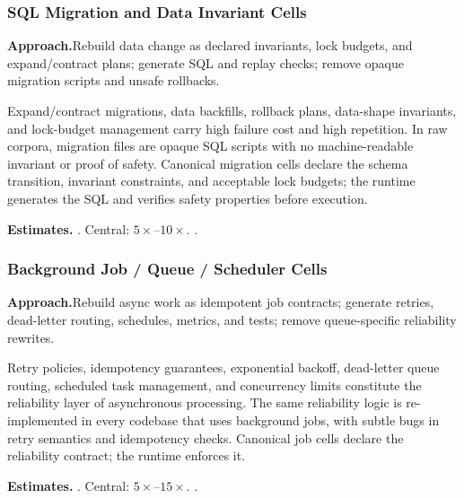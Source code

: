 \subsubsection{SQL Migration and Data Invariant Cells}
\label{ssec:migration-cells}

\smallskip\noindent
\textbf{Approach.}\quad Rebuild data change as declared invariants, lock budgets, and expand/contract plans; generate SQL and replay checks; remove opaque migration scripts and unsafe rollbacks.

Expand/contract migrations, data backfills, rollback plans, data-shape
invariants, and lock-budget management carry high failure cost and high
repetition.  In raw corpora, migration files are opaque SQL scripts with
no machine-readable invariant or proof of safety.  Canonical migration
cells declare the schema transition, invariant constraints, and
acceptable lock budgets; the runtime generates the SQL and verifies
safety properties before execution.

\smallskip\noindent
\textbf{Estimates.}\quad
{}.\quad
Central: $5\times$--$10\times$.\quad
{}.

\subsubsection{Background Job / Queue / Scheduler Cells}
\label{ssec:job-cells}

\smallskip\noindent
\textbf{Approach.}\quad Rebuild async work as idempotent job contracts; generate retries, dead-letter routing, schedules, metrics, and tests; remove queue-specific reliability rewrites.

Retry policies, idempotency guarantees, exponential backoff, dead-letter
queue routing, scheduled task management, and concurrency limits
constitute the reliability layer of asynchronous processing.  The same
reliability logic is re-implemented in every codebase that uses
background jobs, with subtle bugs in retry semantics and idempotency
checks.  Canonical job cells declare the reliability contract; the
runtime enforces it.

\smallskip\noindent
\textbf{Estimates.}\quad
{}.\quad
Central: $5\times$--$15\times$.\quad
{}.

